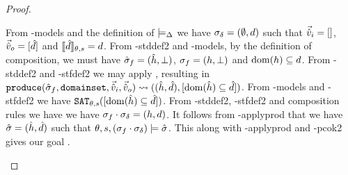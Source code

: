\begin{proof}
\pfcase{$\delta = \domainset$}

\begin{hypvlist}
 From \hyp{models} and the definition of $\models_{\Delta}$ we have $\sigma_\delta=(\emptyset,d)$ such that $\vec{\hat{v}}_i=[]$, $\vec{\hat{v}}_o=[\hat{d}]$ and $\llbracket\hat{d}\rrbracket_{\theta,s}=d$.
 From \hyp{stddef2} and \hyp{models}, by the definition of composition, we must have $\hat{\sigma}_f=(\hat{h},\bot)$, $\sigma_f=(h,\bot)$ and $\operatorname{dom}(h)\subseteq d$.
 From \hyp{stddef2} and \hyp{stfdef2} we may apply , resulting in $\\\texttt{produce}(\hat{\sigma}_f,\texttt{domainset},\vec{\hat{v}}_i,\vec{\hat{v}}_o)\rightsquigarrow ((\hat{h}, \hat{d}), [\operatorname{dom}(\hat{h})\subseteq \hat{d}])$.
 From \hyp{models} and \hyp{stfdef2} we have $\texttt{SAT}_{\mathit{\theta,s}}([\operatorname{dom}(\hat{h})\subseteq \hat{d}])$.
 From \hyp{stddef2}, \hyp{stfdef2} and composition rules we have we have $\sigma_f\cdot\sigma_\delta=(h,d)$. It follows from \hyp{applyprod} that we have $\hat{\sigma}=(\hat{h},\hat{d})$ such that $\theta,s,(\sigma_f\cdot\sigma_\delta)\models\hat{\sigma}$. This along with \hyp{applyprod} and \hyp{pcok2} gives our goal .
\end{hypvlist}

\end{proof}

